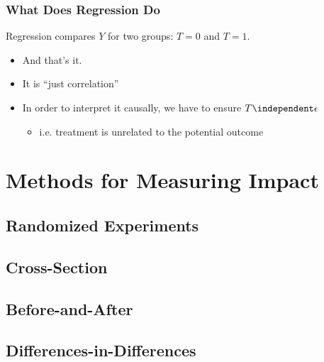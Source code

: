 \documentclass[mathserif, xcolor=table, svgnames]{beamer}
\begin{document}
\begin{frame}
  \frametitle{What Does Regression Do}
  Regression compares $Y$ for two groups: $T=0$ and $T=1$.
  \begin{itemize}
  \item And that's it.
  \item It is ``just correlation''
  \item In order to interpret it causally, we have to ensure $T
    \independent \epsilon$
    \begin{itemize}
    \item i.e. treatment is unrelated to the potential outcome
    \end{itemize}
  \end{itemize}
\end{frame}

\section[Estimators]{Methods for Measuring Impact}

\subsection[RCT]{Randomized Experiments}
\frame{\tableofcontents[currentsubsection]}

{


}

\subsection{Cross-Section}
\frame{\tableofcontents[currentsubsection]}

{

}

\subsection{Before-and-After}
\frame{\tableofcontents[currentsubsection]}

{

}


\subsection[Dif-in-Dif]{Differences-in-Differences}
\frame{\tableofcontents[currentsubsection]}
\end{document}
